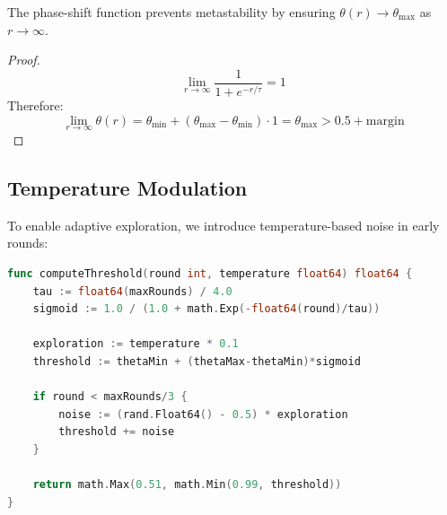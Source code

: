 \begin{lemma}
The phase-shift function prevents metastability by ensuring $\theta(r) \to \theta_{\max}$ as $r \to \infty$.
\end{lemma}

\begin{proof}
$$\lim_{r \to \infty} \frac{1}{1 + e^{-r/\tau}} = 1$$
Therefore:
$$\lim_{r \to \infty} \theta(r) = \theta_{\min} + (\theta_{\max} - \theta_{\min}) \cdot 1 = \theta_{\max} > 0.5 + \text{margin}$$
\end{proof}

\subsection{Temperature Modulation}

To enable adaptive exploration, we introduce temperature-based noise in early rounds:

\begin{lstlisting}[language=Go, caption=Temperature-modulated threshold computation]
func computeThreshold(round int, temperature float64) float64 {
    tau := float64(maxRounds) / 4.0
    sigmoid := 1.0 / (1.0 + math.Exp(-float64(round)/tau))
    
    exploration := temperature * 0.1
    threshold := thetaMin + (thetaMax-thetaMin)*sigmoid
    
    if round < maxRounds/3 {
        noise := (rand.Float64() - 0.5) * exploration
        threshold += noise
    }
    
    return math.Max(0.51, math.Min(0.99, threshold))
}
\end{lstlisting}

